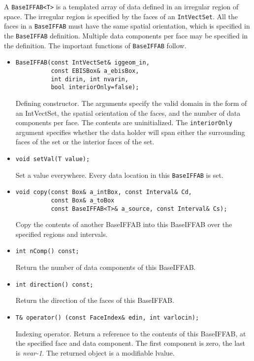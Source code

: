 A {\tt BaseIFFAB<T>} is a templated 
array of data defined in an irregular region of space.
The irregular region is specified by the faces of an 
{\tt IntVectSet}.  All the faces in a
{\tt BaseIFFAB} must have the same spatial orientation, which is
specified in the {\tt BaseIFFAB} definition.  Multiple data components per
face may be specified in the definition.  The important functions of
{\tt BaseIFFAB} follow.   
\begin{itemize}
\item \begin{verbatim}
BaseIFFAB(const IntVectSet& iggeom_in, 
          const EBISBox& a_ebisBox,
          int dirin, int nvarin,
          bool interiorOnly=false);
\end{verbatim}
Defining constructor. The arguments specify the valid domain in the form of an
IntVectSet, the spatial orientation of the faces, and the number of
data components per face.  The contents are uninitialized.    
The  {\tt interiorOnly} argument specifies whether the data holder
will span either the surrounding faces of the set or the interior
faces of the set.

\item \begin{verbatim}
void setVal(T value);
\end{verbatim}
Set a value everywhere.  Every data location in this {\tt BaseIFFAB} is set.

\item \begin{verbatim}
void copy(const Box& a_intBox, const Interval& Cd, 
          const Box& a_toBox
          const BaseIFFAB<T>& a_source, const Interval& Cs);
\end{verbatim} 
Copy the contents of another BaseIFFAB into this BaseIFFAB over
the specified regions and intervals.

\item \begin{verbatim}
int nComp() const;
\end{verbatim}
Return the number of data components of this BaseIFFAB.

\item \begin{verbatim}
int direction() const;
\end{verbatim}
Return the direction of the faces of this BaseIFFAB.

\item \begin{verbatim}
T& operator() (const FaceIndex& edin, int varlocin);
\end{verbatim}
Indexing operator.  Return a reference to the contents of this BaseIFFAB,
at the specified face and data component.  The first component is
zero, the last is {\em nvar-1}.  The returned object is a modifiable
lvalue. 

\end{itemize}

